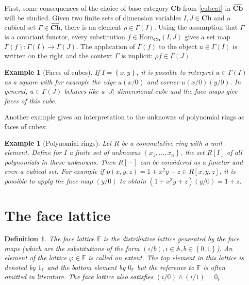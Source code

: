 \documentclass[12pt,a4paper,twoside,xetex]{book} %
\newcommand{\keyword}[1]{\emph{#1}\index{#1}}
\newtheorem{definition}[theorem]{Definition}
\newtheorem{example}[theorem]{Example}
\newcommand{\psh}[1]{\widehat{#1}}
\newcommand{\homo}[3]{\text{Hom}_{#1}\left(#2,#3\right)}
\newcommand{\cube}[0]{\textbf{Cb}}
\begin{document}
First, some consequences of the choice of base category $\cube$ from \cref{cubcat} in $\psh{\cube}$ will be studied. Given two finite sets of dimension variables $I,J \in \cube$ and a cubical set $\Gamma \in \psh{\cube}$,
there is an element $\rho \in \Gamma (I)$. Using the assumption that $\Gamma$ 
is a covariant functor, every substitution $f \in \homo{\cube}{I}{J}$ 
gives a set map $\Gamma (f) : \Gamma (I) \rightarrow \Gamma (J)$. 
The application of $\Gamma(f)$ to the object $u \in \Gamma (I)$ is written on 
the right and the context $\Gamma$ is implicit: $\rho f \in \Gamma(J)$. 

\begin{example}[Faces of cubes]
If $I = \left\{x,y \right\}$, it is possible to interpret $u \in \Gamma(I)$ as 
a square with for example the edge $u(x/0)$ and corner $u(x/0)(y/0)$. In 
general, $u\in \Gamma (J)$ behaves like a $|J|$-dimensional cube and the face 
maps give faces of this cube.
\end{example}

Another example gives an interpretation to the unknowns of polynomial rings as faces of cubes:

\begin{example}[Polynomial rings]
Let $R$ be a commutative ring with a unit element. Define for $I$ a finite set 
of unknowns $\left\{x_1 , ..., x_n \right\}$, the set $R[I]$ of all polynomials 
in these unknowns. Then $R[-]$ can be considered as a functor and even a 
cubical set. For example if $p(x,y,z) = 1 + x^2y +z \in R[x,y,z]$, it is 
possible to apply the face map $(y/0)$ to obtain $(1+x^2 y +z ) (y/0) = 1+z$.
\end{example}

\section{The face lattice}

\begin{definition}\label{facelattice}
The \keyword{face lattice} $\mathbb{F}$ is the distributive lattice generated 
by the face maps (which are the substitutions of the form $(i/b), i\in 
\mathbb{A}, b \in \left\{ 0,1 \right\}$). An element of the lattice $\varphi 
\in \mathbb{F}$ is called an \keyword{extent}. The top element in this lattice 
is denoted by $1_{\mathbb{F}}$ and the bottom element by $0_{\mathbb{F}}$ but 
the reference to $\mathbb{F}$ is often omitted in literature. The face lattice 
also satisfies $(i/0) \wedge (i/1) = 0_{\mathbb{F}}$. 
\end{definition}
\end{document}
